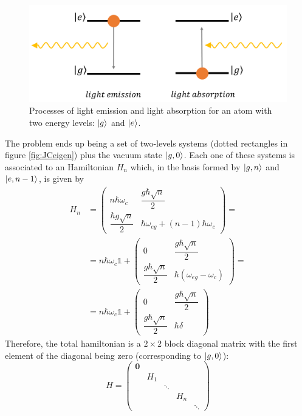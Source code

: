 \begin{figure}[t]
\centering
    \includegraphics[width=0.67\linewidth]{images/EmsissionAbsorption.png}
    \caption{Processes of light emission and light absorption for an atom with two energy levels: $\ket{g}$ and $\ket{e}$. }
    \label{fig:AbEm}
\end{figure}

The problem ends up being a set of two-levels systems (dotted rectangles in figure \ref{fig:JCeigen}) plus the vacuum state $\ket{g,0}$. Each one of these systems is associated to an Hamiltonian $H_n$ which, in the basis formed by $\ket{g,n}$ and $\ket{e,n-1}$, is given by
\begin{align*}
    H_n & =
    \begin{pmatrix}
    n \hbar \omega_c & \dfrac{g \hbar \sqrt{n}}{2} \\
    \dfrac{\hbar g \sqrt{n}}{2} & \hbar \omega_{eg} +  (n-1) \hbar \omega_c
    \end{pmatrix} = \\ 
        &= n \hbar \omega_c \mathbb{1} + 
        \begin{pmatrix}
            0 & \dfrac{g \hbar \sqrt{n}}{2} \\
            \dfrac{g \hbar \sqrt{n}}{2} & \hbar (\omega_{eg} - \omega_c)
        \end{pmatrix} = \\
        &= n \hbar \omega_c \mathbb{1} +
        \begin{pmatrix} 
            0 & \dfrac{g \hbar \sqrt{n}}{2} \\
            \dfrac{g \hbar \sqrt{n}}{2} & \hbar \delta
        \end{pmatrix}
\end{align*}
Therefore, the total hamiltonian is a $2 \times 2$ block diagonal matrix with the first element of the diagonal being zero (corresponding to $\ket{g, 0}$):
\begin{equation*}
H = \left(
    \begin{array}{ccccc}
     \mathbf{0} &  &  &  \\
     & H_1 &  &  \\
     & & \ddots & \\
     & & & H_n & \\ 
     & & & & \ddots
    \end{array}
\right)
\end{equation*}
